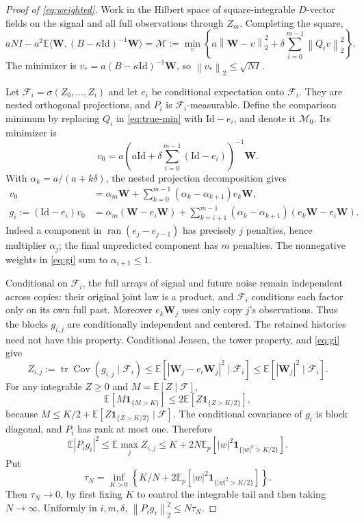 \documentclass[11pt]{article}
\theoremstyle{remark}\newtheorem{remark}[theorem]{Remark}
\newcommand{\E}{\mathbb E}
\newcommand{\Id}{\mathrm{Id}}
\newcommand{\tr}{\operatorname{tr}}
\newcommand{\Cov}{\operatorname{Cov}}
\newcommand{\norm}[1]{\left\lVert #1\right\rVert}
\newcommand{\ind}{\mathbf 1}
\begin{document}
\begin{proof}[Proof of \eqref{eq:weighted}]
Work in the Hilbert space of square-integrable $D$-vector fields on the
signal and all full observations through $Z_m$. Completing the square,
\begin{equation}\label{eq:true-min}
aNI-a^2\E\langle\mathbf W,(B-\kappa\Id)^{-1}\mathbf W\rangle
=\mathcal M
:=\min_v\left\{a\norm{\mathbf W-v}_2^2+
\delta\sum_{i=0}^{m-1}\norm{Q_i v}_2^2\right\}.
\end{equation}
The minimizer is $v_*=a(B-\kappa\Id)^{-1}\mathbf W$, so
$\norm{v_*}_2\le\sqrt{NI}$.

Let $\mathcal F_i=\sigma(Z_0,\ldots,Z_i)$ and let $e_i$ be conditional
expectation onto $\mathcal F_i$. They are nested orthogonal projections,
and $P_i$ is $\mathcal F_i$-measurable. Define the comparison minimum by
replacing $Q_i$ in \eqref{eq:true-min} with $\Id-e_i$, and denote it
$\mathcal M_0$. Its minimizer is
\[
v_0=a\left(a\Id+\delta\sum_{i=0}^{m-1}(\Id-e_i)\right)^{-1}\mathbf W.
\]
With $\alpha_k=a/(a+k\delta)$, the nested projection decomposition gives
\begin{align}
v_0&=\alpha_m\mathbf W+
\sum_{k=0}^{m-1}(\alpha_k-\alpha_{k+1})e_k\mathbf W,
\label{eq:v0}\\
g_i:=(\Id-e_i)v_0
&=\alpha_m(\mathbf W-e_i\mathbf W)+
\sum_{k=i+1}^{m-1}(\alpha_k-\alpha_{k+1})
(e_k\mathbf W-e_i\mathbf W).
\label{eq:gi}
\end{align}
Indeed a component in $\operatorname{ran}(e_j-e_{j-1})$ has precisely
$j$ penalties, hence multiplier $\alpha_j$; the final unpredicted
component has $m$ penalties. The nonnegative weights in \eqref{eq:gi}
sum to $\alpha_{i+1}\le1$.

Conditional on $\mathcal F_i$, the full arrays of signal and future noise
remain independent across copies: their original joint law is a product,
and $\mathcal F_i$ conditions each factor only on its own full past.
Moreover $e_k\mathbf W_j$ uses only copy $j$'s observations.
Thus the blocks $g_{i,j}$ are conditionally independent and centered.
The retained histories need not have this property.
Conditional Jensen, the tower property, and \eqref{eq:gi} give
\[
Z_{i,j}:=\tr\Cov(g_{i,j}\mid\mathcal F_i)
\le\E[|\mathbf W_j-e_i\mathbf W_j|^2\mid\mathcal F_i]
\le\E[|\mathbf W_j|^2\mid\mathcal F_i].
\]
For any integrable $Z\ge0$ and $M=\E[Z\mid\mathcal F]$,
\[
\E[M\ind_{\{M>K\}}]\le2\E[Z\ind_{\{Z>K/2\}}],
\]
because $M\le K/2+\E[Z\ind_{\{Z>K/2\}}\mid\mathcal F]$.
The conditional covariance of $g_i$ is block diagonal, and $P_i$ has
rank at most one. Therefore
\[
\E|P_i g_i|^2
\le\E\max_j Z_{i,j}
\le K+2N\E_p[|w|^2\ind_{\{|w|^2>K/2\}}].
\]
Put
\[
\tau_N=\inf_{K>0}\left\{K/N+
2\E_p[|w|^2\ind_{\{|w|^2>K/2\}}]\right\}.
\]
Then $\tau_N\to0$, by first fixing $K$ to control the integrable tail
and then taking $N\to\infty$. Uniformly in $i,m,\delta$,
$\norm{P_i g_i}_2^2\le N\tau_N$.


\end{proof}
\end{document}
